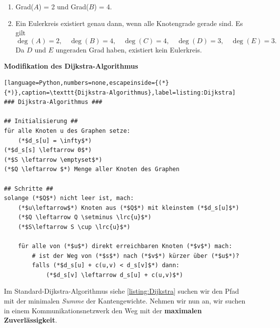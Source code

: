 \begin{questions}
\droptotalpoints

\begin{solution}
\begin{enumerate}
	\item Grad($A$) = 2 und Grad($B$) = 4.

	\item Ein Eulerkreis existiert genau dann, wenn alle Knotengrade gerade sind. Es gilt
	\[
		\deg(A)=2, \quad \deg(B)=4, \quad \deg(C)=4, \quad \deg(D)=3, \quad \deg(E)=3.
	\]
	Da \(D\) und \(E\) ungeraden Grad haben, existiert kein Eulerkreis.
\end{enumerate}
\end{solution}

\clearpage

\question[3]
\textbf{Modifikation des Dijkstra-Algorithmus}

\begin{lstlisting}[language=Python,numbers=none,escapeinside={(*}{*)},caption=\texttt{Dijkstra-Algorithmus},label=listing:Dijkstra]
### Dijkstra-Algorithmus ###

## Initialisierung ##
für alle Knoten u des Graphen setze:
    (*$d_s[u] = \infty$*)
(*$d_s[s] \leftarrow 0$*)
(*$S \leftarrow \emptyset$*)
(*$Q \leftarrow $*) Menge aller Knoten des Graphen

## Schritte ##
solange (*$Q$*) nicht leer ist, mach:
    (*$u\leftarrow$*) Knoten aus (*$Q$*) mit kleinstem (*$d_s[u]$*)
    (*$Q \leftarrow Q \setminus \lrc{u}$*)
    (*$S\leftarrow S \cup \lrc{u}$*)

    für alle von (*$u$*) direkt erreichbaren Knoten (*$v$*) mach:
        # ist der Weg von (*$s$*) nach (*$v$*) kürzer über (*$u$*)?
        falls (*$d_s[u] + c(u,v) < d_s[v]$*) dann:
            (*$d_s[v] \leftarrow d_s[u] + c(u,v)$*)
\end{lstlisting}

Im Standard-Dijkstra-Algorithmus siehe \cref{listing:Dijkstra} suchen wir den Pfad mit der minimalen \textit{Summe} der Kantengewichte. Nehmen wir nun an, wir suchen in einem Kommunikationsnetzwerk den Weg mit der \textbf{maximalen Zuverlässigkeit}.


\end{questions}
